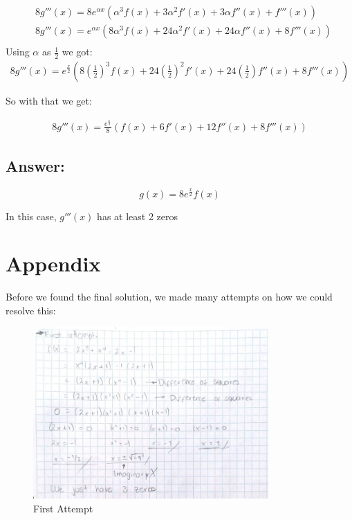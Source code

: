 \documentclass{article}
\begin{document}
    \begin{equation}
        \begin{split}
            &8g'''(x) = 8e^{\alpha x} (\alpha ^3 f(x) + 3\alpha ^2 f'(x) + 3\alpha f''(x) + f'''(x))\\
            &8g'''(x) = e^{\alpha x} (8\alpha ^3 f(x) + 24\alpha ^2 f'(x) + 24\alpha f''(x) + 8f'''(x))\\
        \end{split}
    \end{equation}
    Using $\alpha$ as $\frac{1}{2}$ we got:
    \begin{equation}
        \begin{split}
            8g'''(x) = 
            e^{\frac{x}{2}} 
            \left(8\left(\frac{1}{2}\right)^3 f(x) + 
            24\left(\frac{1}{2}\right)^2 f'(x) + 
            24\left(\frac{1}{2}\right) f''(x) + 
            8f'''(x)\right)
        \end{split}
    \end{equation}

    So with that we get:

    \begin{equation}
        \begin{split}
            8g'''(x) = 
            \frac{e^{\frac{x}{2}}}{8} 
            \left(f(x) + 
            6 f'(x) + 
            12 f''(x) + 
            8f'''(x)\right)
        \end{split}
    \end{equation}

    \subsection{Answer:}
    $$g(x) = 8e^{\frac{x}{2}} f(x)$$

    In this case, $g'''(x)$ has at least 2 zeros

    \section{Appendix}
    Before we found the final solution, we made many attempts on how
    we could resolve this:

    \begin{figure}[H]
        \centering
        \includegraphics[width=340px]{img/firstattempt.png}
        \caption{First Attempt}
    \end{figure}
\end{document}
